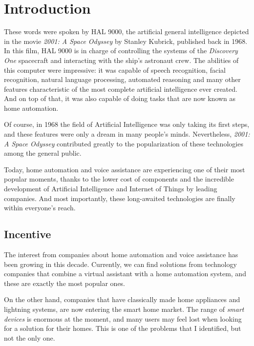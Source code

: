 \chapter{Introduction}


These words were spoken by HAL 9000, the artificial general intelligence depicted in the movie \textit{2001: A Space Odyssey} 
by Stanley Kubrick, published back in 1968. In this film, HAL 9000 is in charge of controlling the systems of the 
\textit{Discovery One} spacecraft and interacting with the ship's astronaut crew. The abilities of this computer were impressive: it 
was capable of speech recognition, facial recognition, natural language processing, automated reasoning and many other features 
characteristic of the most complete artificial intelligence ever created. And on top  of that, it was also capable of doing tasks 
that are now known as home automation.

Of course, in 1968 the field of Artificial Intelligence was only taking its first steps, and these features were only a dream in many
people's minds. Nevertheless, \textit{2001: A Space Odyssey} contributed greatly to the popularization of these technologies among 
the general public.

Today, home automation and voice assistance are experiencing one of their most popular moments, thanks to the lower cost of components 
and the incredible development of Artificial Intelligence and Internet of Things by leading companies. And most importantly, these 
long-awaited technologies are finally within everyone's reach.

\section{Incentive}
The interest from companies about home automation and voice assistance has been growing in this decade. Currently, we can find
solutions from technology companies that combine a virtual assistant with a home automation system, and these are exactly the most 
popular ones. 

On the other hand, companies that have classically made home appliances and lightning systems, are now entering the smart home market.
The range of \textit{smart devices} is enormous at the moment, and many users may feel lost when looking for a solution for their homes.
This is one of the problems that I identified, but not the only one.

